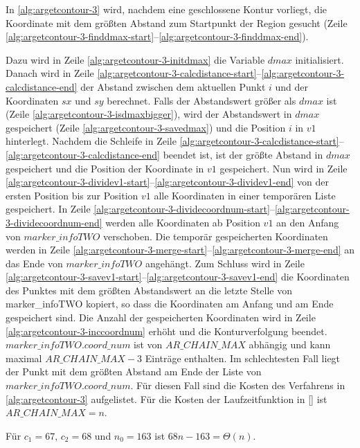 In \autoref{alg:argetcontour-3} wird, nachdem eine geschlossene Kontur vorliegt, die Koordinate mit dem größten Abstand
 zum Startpunkt der Region gesucht (Zeile
 \ref{alg:argetcontour-3-finddmax-start}--\ref{alg:argetcontour-3-finddmax-end}).

Dazu wird in Zeile \ref{alg:argetcontour-3-initdmax} die Variable $\mathit{dmax}$ initialisiert. Danach wird in Zeile
 \ref{alg:argetcontour-3-calcdistance-start}--\ref{alg:argetcontour-3-calcdistance-end} der Abstand zwischen dem
 aktuellen Punkt $i$ und der Koordinaten $\mathit{sx}$ und $\mathit{sy}$ berechnet. Falls der Abstandswert größer als
 $\mathit{dmax}$ ist (Zeile \ref{alg:argetcontour-3-isdmaxbigger}), wird der Abstandswert in $\mathit{dmax}$
 gespeichert (Zeile \ref{alg:argetcontour-3-savedmax}) und die Position $i$ in $\mathit{v1}$ hinterlegt. Nachdem die
 Schleife in Zeile \ref{alg:argetcontour-3-calcdistance-start}--\ref{alg:argetcontour-3-calcdistance-end} beendet ist,
 ist der größte Abstand in $\mathit{dmax}$ gespeichert und die Position der Koordinate in $\mathit{v1}$ gespeichert.
 Nun wird in Zeile \ref{alg:argetcontour-3-dividev1-start}--\ref{alg:argetcontour-3-dividev1-end} von der ersten
 Position bis zur Position $\mathit{v1}$ alle Koordinaten in einer temporären Liste gespeichert. In Zeile
 \ref{alg:argetcontour-3-dividecoordnum-start}--\ref{alg:argetcontour-3-dividecoordnum-end} werden alle Koordinaten ab
 Position $\mathit{v1}$ an den Anfang von $\mathit{marker\_infoTWO}$ verschoben. Die temporär gespeicherten Koordinaten
 werden in Zeile \ref{alg:argetcontour-3-merge-start}--\ref{alg:argetcontour-3-merge-end} an das Ende von
 $\mathit{marker\_infoTWO}$ angehängt. Zum Schluss wird in Zeile
 \ref{alg:argetcontour-3-savev1-start}--\ref{alg:argetcontour-3-savev1-end} die Koordinaten des Punktes mit dem größten
 Abstandswert an die letzte Stelle von marker\_infoTWO kopiert, so dass die Koordinaten am Anfang und am Ende
 gespeichert sind. Die Anzahl der gespeicherten Koordinaten wird in Zeile \ref{alg:argetcontour-3-inccoordnum} erhöht
 und die Konturverfolgung beendet. $\mathit{marker\_infoTWO.coord\_num}$ ist von $\mathit{AR\_CHAIN\_MAX}$ abhängig und
 kann maximal $\mathit{AR\_CHAIN\_MAX} - 3$ Einträge enthalten. Im schlechtesten Fall liegt der Punkt mit dem größten
 Abstand am Ende der Liste von $\mathit{marker\_infoTWO.coord\_num}$. Für diesen Fall sind die Kosten des Verfahrens
 in \autoref{alg:argetcontour-3} aufgelistet. Für die Kosten der Laufzeitfunktion in
 \autoref{} ist $\mathit{AR\_CHAIN\_MAX} = n$.

Für $c_{1} = 67$, $c_{2} = 68$ und $n_{0} = 163$ ist $68n - 163 = \Theta(n)$.

